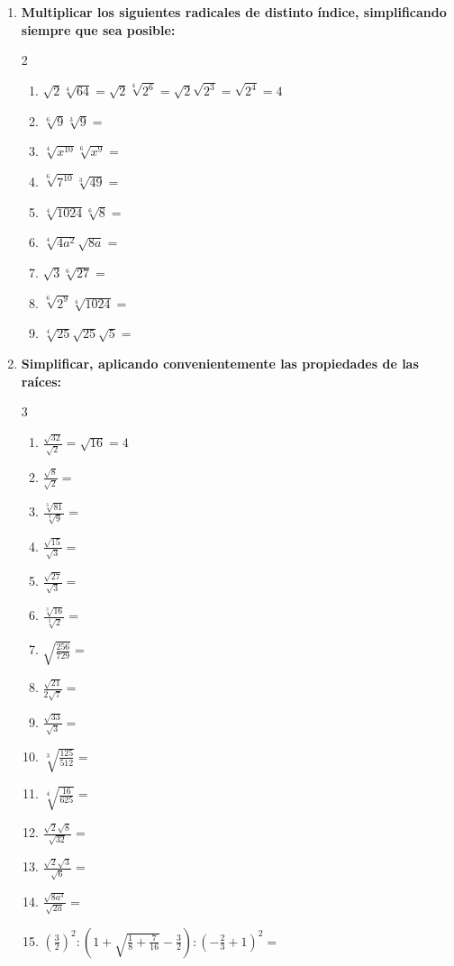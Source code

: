 \documentclass[a4paper,12pt]{article}
\begin{document}
\begin{enumerate}
    \item \textbf{Multiplicar los siguientes radicales de distinto índice, simplificando siempre que sea posible:}
    \begin{multicols}{2}
    \begin{enumerate}[label=\alph*)]
        \item $\sqrt{2}\sqrt[4]{64} = \sqrt{2}\sqrt[4]{2^6} = \sqrt{2}\sqrt{2^3} = \sqrt{2^4} = 4$
        \item $\sqrt[6]{9}\sqrt[3]{9} =$
        \item $\sqrt[4]{x^{10}}\sqrt[6]{x^9} =$
        \item $\sqrt[6]{7^{10}}\sqrt[3]{49} =$
        \item $\sqrt[4]{1024}\sqrt[6]{8} =$
        \item $\sqrt[4]{4a^2}\sqrt{8a} =$
        \item $\sqrt{3}\sqrt[6]{27} =$
        \item $\sqrt[6]{2^9}\sqrt[4]{1024} =$
        \item $\sqrt[4]{25}\sqrt{25}\sqrt{5} =$
    \end{enumerate}
    \end{multicols}

    \item \textbf{Simplificar, aplicando convenientemente las propiedades de las raíces:}
    \begin{multicols}{3}
    \begin{enumerate}[label=\alph*)]
        \item $\frac{\sqrt{32}}{\sqrt{2}} = \sqrt{16} = 4$
        \item $\frac{\sqrt{8}}{\sqrt{2}} =$
        \item $\frac{\sqrt[3]{81}}{\sqrt[3]{9}} =$
        \item $\frac{\sqrt{15}}{\sqrt{3}} =$
        \item $\frac{\sqrt{27}}{\sqrt{3}} =$
        \item $\frac{\sqrt[3]{16}}{\sqrt[3]{2}} =$
        \item $\sqrt{\frac{256}{729}} =$
        \item $\frac{\sqrt{21}}{2\sqrt{7}} =$
        \item $\frac{\sqrt{33}}{\sqrt{3}} =$
        \item $\sqrt[3]{\frac{125}{512}} =$
        \item $\sqrt[4]{\frac{16}{625}} =$
        \item $\frac{\sqrt{2}\sqrt{8}}{\sqrt{32}} =$
        \item $\frac{\sqrt{2}\sqrt{3}}{\sqrt{6}} =$
        \item $\frac{\sqrt{8a^3}}{\sqrt{2a}} =$
        \item $(\frac{3}{2})^2 : \left(1 + \sqrt{\frac{1}{8} + \frac{7}{16}} - \frac{3}{2}\right) : \left(-\frac{2}{3} + 1\right)^2 =$
    \end{enumerate}
    \end{multicols}


\end{enumerate}
\end{document}
